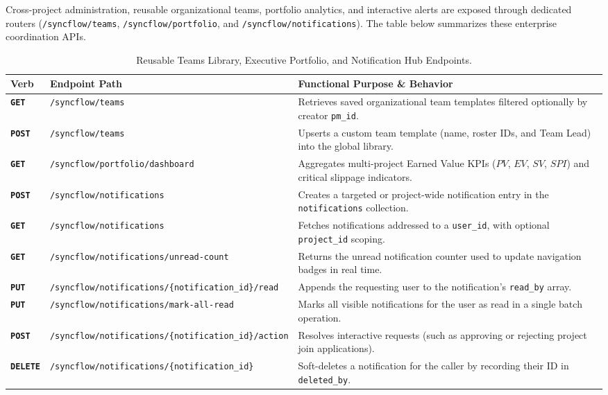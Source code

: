\newpage

\noindent Cross-project administration, reusable organizational teams, portfolio analytics, and interactive alerts are exposed through dedicated routers (\texttt{/syncflow/teams}, \texttt{/syncflow/portfolio}, and \texttt{/syncflow/notifications}). The table below summarizes these enterprise coordination APIs.

\begin{table}[H]
\centering
\footnotesize
\setlength{\tabcolsep}{5pt}
\renewcommand{\arraystretch}{1.28}
\caption*{Reusable Teams Library, Executive Portfolio, and Notification Hub Endpoints.}
\vspace{-2pt}
\begin{tabularx}{\textwidth}{p{1.3cm} >{\raggedright\arraybackslash}p{6.0cm} X}
\toprule
\textbf{Verb} & \textbf{Endpoint Path} & \textbf{Functional Purpose \& Behavior} \\
\midrule
\textbf{\texttt{GET}} & \texttt{/syncflow/teams} & Retrieves saved organizational team templates filtered optionally by creator \texttt{pm\_id}. \\
\textbf{\texttt{POST}} & \texttt{/syncflow/teams} & Upserts a custom team template (name, roster IDs, and Team Lead) into the global library. \\
\textbf{\texttt{GET}} & \texttt{/syncflow/portfolio/dashboard} & Aggregates multi-project Earned Value KPIs ($PV$, $EV$, $SV$, $SPI$) and critical slippage indicators. \\
\textbf{\texttt{POST}} & \texttt{/syncflow/notifications} & Creates a targeted or project-wide notification entry in the \texttt{notifications} collection. \\
\textbf{\texttt{GET}} & \texttt{/syncflow/notifications} & Fetches notifications addressed to a \texttt{user\_id}, with optional \texttt{project\_id} scoping. \\
\textbf{\texttt{GET}} & \texttt{/syncflow/notifications/\allowbreak unread-count} & Returns the unread notification counter used to update navigation badges in real time. \\
\textbf{\texttt{PUT}} & \texttt{/syncflow/notifications/\allowbreak \{notification\_id\}/read} & Appends the requesting user to the notification's \texttt{read\_by} array. \\
\textbf{\texttt{PUT}} & \texttt{/syncflow/notifications/\allowbreak mark-all-read} & Marks all visible notifications for the user as read in a single batch operation. \\
\textbf{\texttt{POST}} & \texttt{/syncflow/notifications/\allowbreak \{notification\_id\}/action} & Resolves interactive requests (such as approving or rejecting project join applications). \\
\textbf{\texttt{DELETE}} & \texttt{/syncflow/notifications/\allowbreak \{notification\_id\}} & Soft-deletes a notification for the caller by recording their ID in \texttt{deleted\_by}. \\
\bottomrule
\end{tabularx}
\end{table}

